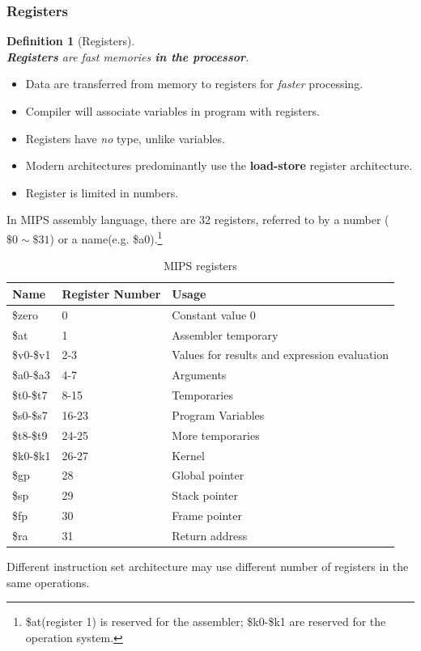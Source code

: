 \documentclass[12pt]{article}
\newtheorem{definition}{Definition}[section]
\theoremstyle{definition}
\begin{document}
\subsubsection{Registers}
\begin{definition}[Registers]\hfill\\\normalfont \textbf{Registers} are fast memories \textbf{in the processor}.
\end{definition}
\begin{itemize}
  \item Data are transferred from memory to registers for \textit{faster} processing.
  \item Compiler will associate variables in program with registers.
  \item Registers have \textit{no} type, unlike variables.
  \item Modern architectures predominantly use the \textbf{load-store} register architecture.
  \item Register is limited in numbers.
\end{itemize}
In MIPS assembly language, there are 32 registers, referred to by a number ($\$ 0\sim \$ 31$) or a name(e.g. \$a0).\footnote{\$at(register 1) is reserved for the assembler; \$k0-\$k1 are reserved for the operation system.}
\clearpage
\begin{table}[h]
\centering
\begin{tabular}{|l|l|p{7cm}|}
\hline
Name&Register Number&Usage\\\hline
\$zero&0&Constant value 0\\\hline
\$at&1&Assembler temporary\\\hline
\$v0-\$v1&2-3&Values for results and expression evaluation\\\hline
\$a0-\$a3&4-7&Arguments\\\hline
\$t0-\$t7&8-15&Temporaries\\\hline
\$s0-\$s7&16-23&Program Variables\\\hline
\$t8-\$t9&24-25&More temporaries\\\hline
\$k0-\$k1&26-27&Kernel\\\hline
\$gp&28&Global pointer\\\hline
\$sp&29&Stack pointer\\\hline
\$fp&30&Frame pointer\\\hline
\$ra&31&Return address\\\hline
\end{tabular}
\caption{MIPS registers}
\end{table}
Different instruction set architecture may use different number of registers in the same operations.
\end{document}
